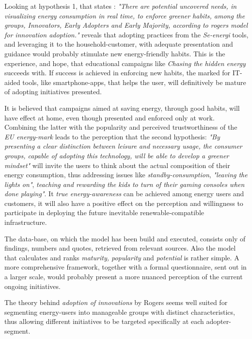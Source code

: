 \documentclass[journal]{IEEEtran}
\begin{document}
Looking at hypothesis 1, that states :
\textit{"There are potential uncovered needs, in visualizing energy consumption in real time, to enforce greener habits, among the groups, Innovators, Early Adopters and Early Majority, according to rogers model for innovation adoption."}
reveals that adopting practices from the \textit{Se-energi} tools, and leveraging it to the household-customer, with adequate presentation and guidance would probably stimulate new energy-friendly habits. This is the experience, and hope, that educational campaigns like \textit{Chasing the hidden energy} succeeds with.
If success is achieved in enforcing new habits, the marked for IT-aided tools, like smartphone-apps, that helps the user, will definitively be mature of adopting initiatives presented.  

It is believed that campaigns aimed at saving energy, through good habits, will have effect at home, even though presented and enforced only at work. Combining the latter with the popularity and perceived trustworthiness of the \textit{EU energy-mark} leads to the perception that the second hypothesis: 
\textit{"By presenting a clear distinction between leisure and necessary usage, the consumer groups, capable of adopting this technology, will be able to develop a greener mindset"} will invite the users to think about the actual composition of their energy consumption, thus addressing issues like \textit{standby-consumption}, \textit{"leaving the lights on"}, \textit{teaching and rewarding the kids to turn of their gaming consoles when done playing"}. It \textit{true energy-awareness} can be achieved among energy users and customers, it will also have a positive effect on the perception and willingness to participate in deploying the future inevitable renewable-compatible infrastructure.   \newline

The data-base, on which the model has been build and executed, consists only of findings, numbers and quotes, retrieved from relevant sources. Also the model that calculates and ranks \textit{maturity, popularity} and \textit{potential} is rather simple. A more comprehensive framework, together with a formal questionnaire, sent out in a larger scale, would probably present a more nuanced perception of the current ongoing initiatives.

The theory behind \textit{adoption of innovations} by Rogers seems well suited for segmenting energy-users into manageable groups with distinct characteristics, thus allowing different initiatives to be targeted specifically at each adopter-segment.
\end{document}
